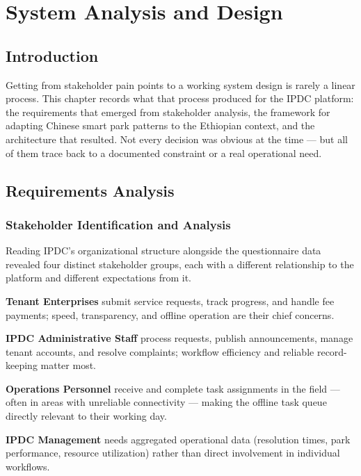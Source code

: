 \chapter{System Analysis and Design}
\label{ch:analysis}

\section{Introduction}

Getting from stakeholder pain points to a working system design is rarely a linear process. This chapter records what that process produced for the IPDC platform: the requirements that emerged from stakeholder analysis, the framework for adapting Chinese smart park patterns to the Ethiopian context, and the architecture that resulted. Not every decision was obvious at the time --- but all of them trace back to a documented constraint or a real operational need.

\section{Requirements Analysis}

\subsection{Stakeholder Identification and Analysis}

Reading IPDC's organizational structure alongside the questionnaire data revealed four distinct stakeholder groups, each with a different relationship to the platform and different expectations from it.

\textbf{Tenant Enterprises} submit service requests, track progress, and handle fee payments; speed, transparency, and offline operation are their chief concerns.

\textbf{IPDC Administrative Staff} process requests, publish announcements, manage tenant accounts, and resolve complaints; workflow efficiency and reliable record-keeping matter most.

\textbf{Operations Personnel} receive and complete task assignments in the field --- often in areas with unreliable connectivity --- making the offline task queue directly relevant to their working day.

\textbf{IPDC Management} needs aggregated operational data (resolution times, park performance, resource utilization) rather than direct involvement in individual workflows.

